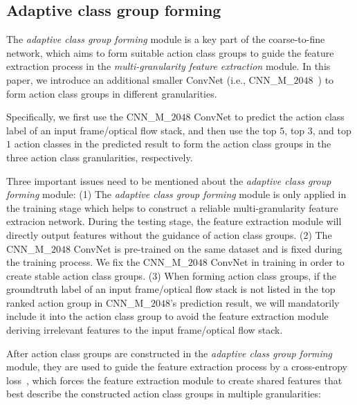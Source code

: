 \documentclass[letterpaper]{article} %
\begin{document}
\subsection{Adaptive class group forming}

The \emph{adaptive class group forming} module is a key part of the coarse-to-fine network, which aims to form suitable action class groups to guide the feature extraction process in the \emph{multi-granularity feature extraction} module. In this paper, we introduce an additional smaller ConvNet (i.e., CNN\_M\_$2048$~\cite{M2048}) to form action class groups in different granularities.

Specifically, we first use the CNN\_M\_$2048$ ConvNet to predict the action class label of an input frame/optical flow stack, and then use the top $5$, top $3$, and top $1$ action classes in the predicted result to form the action class groups in the three action class granularities, respectively.

Three important issues need to be mentioned about the \emph{adaptive class group forming} module: (1) The \emph{adaptive class group forming} module is only applied in the training stage which helps to construct a reliable multi-granularity feature extracion network. During the testing stage, the feature extraction module will directly output features without the guidance of action class groups. (2) The CNN\_M\_$2048$ ConvNet is pre-trained on the same dataset and is fixed during the training process. We fix the CNN\_M\_$2048$ ConvNet in training in order to create stable action class groups. (3) When forming action class groups, if the groundtruth label of an input frame/optical flow stack is not listed in the top ranked action group in CNN\_M\_$2048$'s prediction result, we will mandatorily include it into the action class group to avoid the feature extraction module deriving irrelevant features to the input frame/optical flow stack.

After action class groups are constructed in the \emph{adaptive class group forming} module, they are used to guide the feature extraction process by a cross-entropy loss~\cite{crossentropy}, which forces the feature extraction module to create shared features that best describe the constructed action class groups in multiple granularities:
\end{document}
